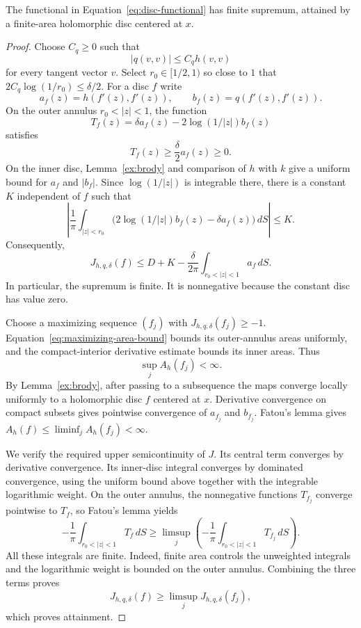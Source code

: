 \begin{proposition}
\label{ex:maximizer}
The functional in Equation~\eqref{eq:disc-functional} has finite
supremum, attained by a finite-area holomorphic disc centered at $x$.
\end{proposition}

\begin{proof}
Choose $C_q\geq0$ such that
\[
 |q(v,v)|\leq C_q h(v,v)
\]
for every tangent vector $v$. Select $r_0\in[1/2,1)$ so close to $1$
that $2C_q\log(1/r_0)\leq\delta/2$. For a disc $f$ write
\[
 a_f(z)=h(f'(z),f'(z)),\qquad b_f(z)=q(f'(z),f'(z)).
\]
On the outer annulus $r_0<|z|<1$, the function
\[
 T_f(z)=\delta a_f(z)-2\log(1/|z|)b_f(z)
\]
satisfies
\begin{equation}
 T_f(z)\geq\frac\delta2 a_f(z)\geq0.
 \label{eq:negative-tail-density}
\end{equation}
On the inner disc, Lemma~\ref{ex:brody} and comparison of $h$ with $k$
give a uniform bound for $a_f$ and $|b_f|$. Since
$\log(1/|z|)$ is integrable there, there is a constant $K$ independent
of $f$ such that
\[
 \left|\frac1\pi\int_{|z|<r_0}
 \bigl(2\log(1/|z|)b_f(z)-\delta a_f(z)\bigr)\,dS\right|
 \leq K.
\]
Consequently,
\begin{equation}
 J_{h,q,\delta}(f)
 \leq D+K-\frac\delta{2\pi}\int_{r_0<|z|<1}a_f\,dS.
 \label{eq:maximizing-area-bound}
\end{equation}
In particular, the supremum is finite. It is nonnegative because the
constant disc has value zero.

Choose a maximizing sequence $(f_j)$ with $J_{h,q,\delta}(f_j)\geq-1$.
Equation~\eqref{eq:maximizing-area-bound} bounds its outer-annulus
areas uniformly, and the compact-interior derivative estimate bounds
its inner areas. Thus
\[
 \sup_j A_h(f_j)<\infty.
\]
By Lemma~\ref{ex:brody}, after passing to a subsequence the maps converge
locally uniformly to a holomorphic disc $f$ centered at $x$. Derivative
convergence on compact subsets gives pointwise convergence of $a_{f_j}$
and $b_{f_j}$. Fatou's lemma gives
$A_h(f)\leq\liminf_j A_h(f_j)<\infty$.

We verify the required upper semicontinuity of $J$. Its central term
converges by derivative convergence. Its inner-disc integral converges
by dominated convergence, using the uniform bound above together with
the integrable logarithmic weight. On the outer annulus, the
nonnegative functions $T_{f_j}$ converge pointwise to $T_f$, so Fatou's
lemma yields
\[
 -\frac1\pi\int_{r_0<|z|<1}T_f\,dS
 \geq\limsup_j
 \left(-\frac1\pi\int_{r_0<|z|<1}T_{f_j}\,dS\right).
\]
All these integrals are finite. Indeed, finite area controls the
unweighted integrals and the logarithmic weight is bounded on the
outer annulus. Combining the three terms proves
\[
 J_{h,q,\delta}(f)\geq\limsup_jJ_{h,q,\delta}(f_j),
\]
which proves attainment.
\end{proof}

